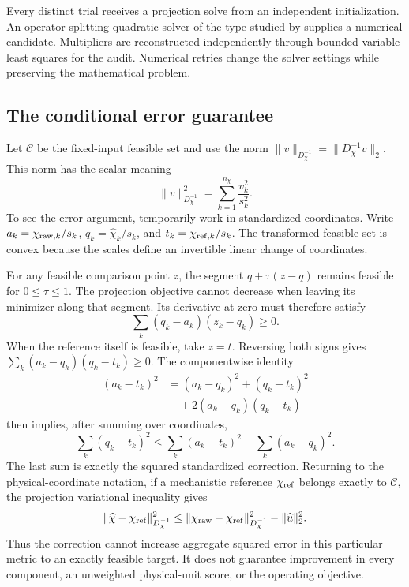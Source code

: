 Every distinct trial receives a projection solve from an independent initialization. An operator-splitting quadratic solver of the type studied by \citet{Stellato2020} supplies a numerical candidate. Multipliers are reconstructed independently through bounded-variable least squares for the audit. Numerical retries change the solver settings while preserving the mathematical problem.

\subsection{The conditional error guarantee}

Let $\mathcal C$ be the fixed-input feasible set and use the norm
$\|v\|_{D_\chi^{-1}}=\|D_\chi^{-1}v\|_2$. This norm has the scalar meaning
\begin{equation}
\|v\|_{D_\chi^{-1}}^2=\sum_{k=1}^{n_\chi}\frac{v_k^2}{s_k^2}.
\end{equation}
To see the error argument, temporarily work in standardized coordinates. Write $a_k=\chi_{{\rm raw},k}/s_k$, $q_k=\widehat\chi_k/s_k$, and $t_k=\chi_{{\rm ref},k}/s_k$. The transformed feasible set is convex because the scales define an invertible linear change of coordinates.

For any feasible comparison point $z$, the segment $q+\tau(z-q)$ remains feasible for $0\le\tau\le1$. The projection objective cannot decrease when leaving its minimizer along that segment. Its derivative at zero must therefore satisfy
\begin{equation}
\sum_k(q_k-a_k)(z_k-q_k)\ge0.
\end{equation}
When the reference itself is feasible, take $z=t$. Reversing both signs gives $\sum_k(a_k-q_k)(q_k-t_k)\ge0$. The componentwise identity
\begin{align}
(a_k-t_k)^2&=(a_k-q_k)^2+(q_k-t_k)^2\\
&\quad+2(a_k-q_k)(q_k-t_k)
\end{align}
then implies, after summing over coordinates,
\begin{equation}
\sum_k(q_k-t_k)^2\le\sum_k(a_k-t_k)^2-\sum_k(a_k-q_k)^2.
\end{equation}
The last sum is exactly the squared standardized correction. Returning to the physical-coordinate notation, if a mechanistic reference $\chi_{\rm ref}$ belongs exactly to $\mathcal C$, the projection variational inequality gives
\begin{equation}
\|\widehat\chi-\chi_{\rm ref}\|_{D_\chi^{-1}}^2
\le\|\chi_{\rm raw}-\chi_{\rm ref}\|_{D_\chi^{-1}}^2
-\|\widehat u\|_2^2.
\label{eq:plant_projection_error_exact}
\end{equation}
Thus the correction cannot increase aggregate squared error in this particular metric to an exactly feasible target. It does not guarantee improvement in every component, an unweighted physical-unit score, or the operating objective.

